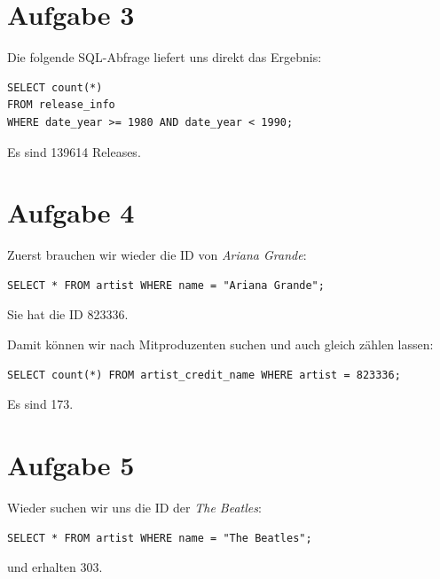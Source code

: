 \documentclass{article}
\begin{document}
	\section*{Aufgabe 3}
	Die folgende SQL-Abfrage liefert uns direkt das Ergebnis:
	\begin{lstlisting}[style=sql]
SELECT count(*) 
FROM release_info 
WHERE date_year >= 1980 AND date_year < 1990;
	\end{lstlisting}
	Es sind 139614 Releases.
	
	\section*{Aufgabe 4}
	Zuerst brauchen wir wieder die ID von \textit{Ariana Grande}:
	\begin{lstlisting}[style=sql]
SELECT * FROM artist WHERE name = "Ariana Grande";
	\end{lstlisting}
	Sie hat die ID 823336.
	
	Damit können wir nach Mitproduzenten suchen und auch gleich zählen lassen:
	\begin{lstlisting}[style=sql]
SELECT count(*) FROM artist_credit_name WHERE artist = 823336;
	\end{lstlisting}
	Es sind 173.
	
	\section*{Aufgabe 5}
	Wieder suchen wir uns die ID der \textit{The Beatles}:
	\begin{lstlisting}[style=sql]
SELECT * FROM artist WHERE name = "The Beatles";
	\end{lstlisting}
	und erhalten 303.
	
\end{document}
